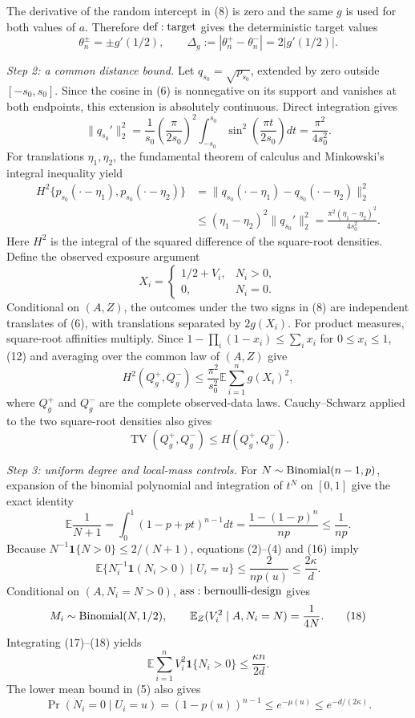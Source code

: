 The derivative of the random intercept in (8) is zero and the same \(g\) is used for both values of \(a\).  Therefore \({\rm def:target}\) gives the deterministic target values
\[
 \theta_n^\pm=\pm g'(1/2),
 \qquad
 \Delta_g:=|\theta_n^+-\theta_n^-|=2|g'(1/2)|.
\tag{10}
\]

\textit{Step 2: a common distance bound.}
Let \(q_{s_0}=\sqrt{p_{s_0}}\), extended by zero outside \([-s_0,s_0]\).  Since the cosine in (6) is nonnegative on its support and vanishes at both endpoints, this extension is absolutely continuous.  Direct integration gives
\[
 \|q_{s_0}'\|_2^2
 =\frac1{s_0}\left(\frac{\pi}{2s_0}\right)^2
 \int_{-s_0}^{s_0}\sin^2\!\left(\frac{\pi t}{2s_0}\right)dt
 =\frac{\pi^2}{4s_0^2}.
\tag{11}
\]
For translations \(\eta_1,\eta_2\), the fundamental theorem of calculus and Minkowski's integral inequality yield
\[
 \begin{aligned}
 H^2\{p_{s_0}(\mathord\cdot-\eta_1),p_{s_0}(\mathord\cdot-\eta_2)\}
 &=\|q_{s_0}(\mathord\cdot-\eta_1)-q_{s_0}(\mathord\cdot-\eta_2)\|_2^2\\
 &\leq(\eta_1-\eta_2)^2\|q_{s_0}'\|_2^2
 =\frac{\pi^2(\eta_1-\eta_2)^2}{4s_0^2}.
 \end{aligned}
\tag{12}
\]
Here \(H^2\) is the integral of the squared difference of the square-root densities.  Define the observed exposure argument
\[
 X_i=\begin{cases}
 1/2+V_i,&N_i>0,\\
 0,&N_i=0.
 \end{cases}
\tag{13}
\]
Conditional on \((A,Z)\), the outcomes under the two signs in (8) are independent translates of (6), with translations separated by \(2g(X_i)\).  For product measures, square-root affinities multiply.  Since \(1-\prod_i(1-x_i)\leq\sum_i x_i\) for \(0\leq x_i\leq1\), (12) and averaging over the common law of \((A,Z)\) give
\[
 H^2(Q_g^+,Q_g^-)
 \leq\frac{\pi^2}{s_0^2}\mathbb E\sum_{i=1}^ng(X_i)^2,
\tag{14}
\]
where \(Q_g^+\) and \(Q_g^-\) are the complete observed-data laws.  Cauchy--Schwarz applied to the two square-root densities also gives
\[
 \operatorname{TV}(Q_g^+,Q_g^-)
 \leq H(Q_g^+,Q_g^-).
\tag{15}
\]

\textit{Step 3: uniform degree and local-mass controls.}
For \(N\sim{\rm Binomial}(n-1,p)\), expansion of the binomial polynomial and integration of \(t^N\) on \([0,1]\) give the exact identity
\[
 \mathbb E\frac1{N+1}
 =\int_0^1(1-p+pt)^{n-1}dt
 =\frac{1-(1-p)^n}{np}
 \leq\frac1{np}.
\tag{16}
\]
Because \(N^{-1}\mathbf1\{N>0\}\leq2/(N+1)\), equations (2)--(4) and (16) imply
\[
 \mathbb E\{N_i^{-1}\mathbf1(N_i>0)\mid U_i=u\}
 \leq\frac{2}{np(u)}\leq\frac{2\kappa}{d}.
\tag{17}
\]
Conditional on \((A,N_i=N>0)\), \({\rm ass:bernoulli\text{-}design}\) gives
\[
 M_i\sim{\rm Binomial}(N,1/2),
 \qquad
 \mathbb E_Z(V_i^2\mid A,N_i=N)=\frac1{4N}.
\tag{18}
\]
Integrating (17)--(18) yields
\[
 \mathbb E\sum_{i=1}^nV_i^2\mathbf1\{N_i>0\}
 \leq\frac{\kappa n}{2d}.
\tag{19}
\]
The lower mean bound in (5) also gives
\[
 \Pr(N_i=0\mid U_i=u)=(1-p(u))^{n-1}
 \leq e^{-\mu(u)}\leq e^{-d/(2\kappa)}.
\tag{20}
\]

